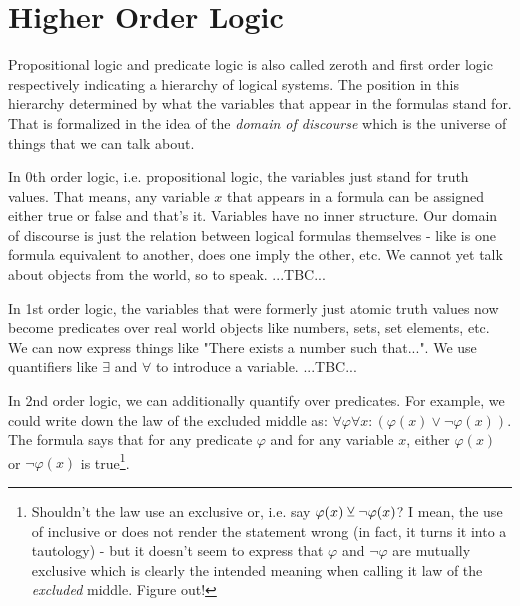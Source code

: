 \section{Higher Order Logic}
Propositional logic and predicate logic is also called zeroth and first order logic respectively indicating a hierarchy of logical systems. The position in this hierarchy determined by what the variables that appear in the formulas stand for. That is formalized in the idea of the \emph{domain of discourse} which is the universe of things that we can talk about.

\medskip
In 0th order logic, i.e. propositional logic, the variables just stand for truth values. That means, any variable $x$ that appears in a formula can be assigned either true or false and that's it. Variables have no inner structure. Our domain of discourse is just the relation between logical formulas themselves - like is one formula equivalent to another, does one imply the other, etc. We cannot yet talk about objects from the world, so to speak. ...TBC...


\medskip
In 1st order logic, the variables that were formerly just atomic truth values now become predicates over real world objects like numbers, sets, set elements, etc. We can now express things like "There exists a number such that...". We use quantifiers like $\exists$ and $\forall$ to introduce a variable. ...TBC...

\medskip
In 2nd order logic, we can additionally quantify over predicates. For example, we could write down the law of the excluded middle as: $\forall \varphi \forall x: (\varphi(x) \vee \neg \varphi(x))$. The formula says that for any predicate $\varphi$ and for any variable $x$, either $\varphi(x)$ or $\neg \varphi(x)$ is true\footnote{Shouldn't the law use an exclusive or, i.e. say $\varphi(x) \mathbin{\veebar} \neg \varphi(x)$? I mean, the use of inclusive or does not render the statement wrong (in fact, it turns it into a tautology) - but it doesn't seem to express that $\varphi$ and $\neg \varphi$ are mutually exclusive which is clearly the intended meaning when calling it law of the \emph{excluded} middle. Figure out!}.




